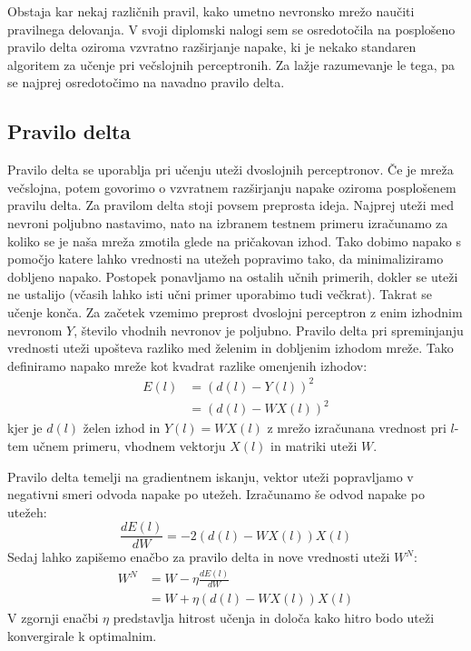 \documentclass[mat1]{fmfdelo}
\begin{document}
Obstaja kar nekaj različnih pravil, kako umetno nevronsko mrežo naučiti pravilnega delovanja. V svoji diplomski nalogi sem se osredotočila na posplošeno pravilo delta oziroma vzvratno razširjanje napake, ki je nekako standaren algoritem za učenje pri večslojnih perceptronih. Za lažje razumevanje le tega, pa se najprej osredotočimo na navadno pravilo delta.

\subsection{Pravilo delta}
Pravilo delta se uporablja pri učenju uteži dvoslojnih perceptronov. Če je mreža večslojna, potem govorimo o vzvratnem razširjanju napake oziroma posplošenem pravilu delta. Za pravilom delta stoji povsem preprosta ideja. Najprej uteži med nevroni poljubno nastavimo, nato na izbranem testnem primeru izračunamo za koliko se je naša mreža zmotila glede na pričakovan izhod. Tako dobimo napako s pomočjo katere lahko vrednosti na utežeh popravimo tako, da minimaliziramo dobljeno napako. Postopek ponavljamo na ostalih učnih primerih, dokler se uteži ne ustalijo (včasih lahko isti učni primer uporabimo tudi večkrat). Takrat se učenje konča.
Za začetek vzemimo preprost dvoslojni perceptron z enim izhodnim nevronom $Y$, število vhodnih nevronov je poljubno. Pravilo delta pri spreminjanju vrednosti uteži upošteva razliko med želenim in dobljenim izhodom mreže. Tako definiramo napako mreže kot kvadrat razlike omenjenih izhodov:
%
\begin{equation}
\begin{aligned}
E(l) &= (d(l)-Y(l))^2 \\
&= (d(l)-WX(l))^2
\end{aligned}
\end{equation}
%
kjer je $d(l)$ želen izhod in $Y(l)= WX(l)$ z mrežo izračunana vrednost pri $l$-tem učnem primeru, vhodnem vektorju $X(l)$ in matriki uteži $W$.

Pravilo delta temelji na gradientnem iskanju, vektor uteži popravljamo v negativni smeri odvoda napake po utežeh. Izračunamo še odvod napake po utežeh:
%
\begin{equation*}
\frac{dE(l)}{dW}= -2(d(l)-WX(l))X(l)
\end{equation*}
%
Sedaj lahko zapišemo enačbo za pravilo delta in nove vrednosti uteži $W^{N}$:
%
\begin{equation}
\begin{aligned}
W^{N} &= W - \eta\frac{dE(l)}{dW} \\
&= W + \eta(d(l)-WX(l))X(l)
\label{utezi}
\end{aligned}
\end{equation}
%
V zgornji enačbi $\eta$ predstavlja hitrost učenja in določa kako hitro bodo uteži konvergirale k optimalnim. 
\end{document}
